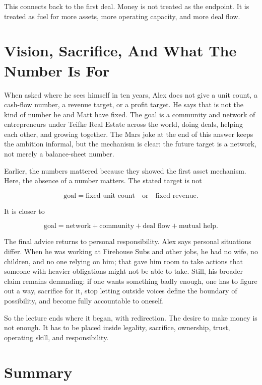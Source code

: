 This connects back to the first deal. Money is not treated as the endpoint. It is treated as fuel for more assets, more operating capacity, and more deal flow.

\section{Vision, Sacrifice, And What The Number Is For}

When asked where he sees himself in ten years, Alex does not give a unit count, a cash-flow number, a revenue target, or a profit target. He says that is not the kind of number he and Matt have fixed. The goal is a community and network of entrepreneurs under Teifke Real Estate across the world, doing deals, helping each other, and growing together. The Mars joke at the end of this answer keeps the ambition informal, but the mechanism is clear: the future target is a network, not merely a balance-sheet number.

Earlier, the numbers mattered because they showed the first asset mechanism. Here, the absence of a number matters. The stated target is not

\begin{equation}
\text{goal}
=
\text{fixed unit count}
\quad \text{or} \quad
\text{fixed revenue}.
\end{equation}

It is closer to

\begin{equation}
\text{goal}
=
\text{network}
+
\text{community}
+
\text{deal flow}
+
\text{mutual help}.
\end{equation}

The final advice returns to personal responsibility. Alex says personal situations differ. When he was working at Firehouse Subs and other jobs, he had no wife, no children, and no one relying on him; that gave him room to take actions that someone with heavier obligations might not be able to take. Still, his broader claim remains demanding: if one wants something badly enough, one has to figure out a way, sacrifice for it, stop letting outside voices define the boundary of possibility, and become fully accountable to oneself.

So the lecture ends where it began, with redirection. The desire to make money is not enough. It has to be placed inside legality, sacrifice, ownership, trust, operating skill, and responsibility.

\section{Summary}

